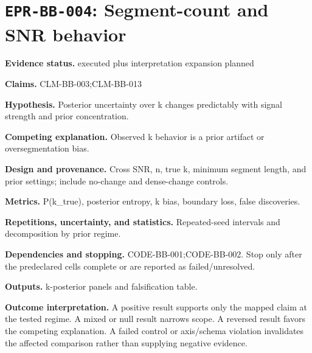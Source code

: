 \section[\texttt{EPR-BB-004}]{\texttt{EPR-BB-004}: Segment-count and SNR behavior}
\textbf{Evidence status.} executed plus interpretation expansion planned\par
\textbf{Claims.} CLM-BB-003;CLM-BB-013\par
\textbf{Hypothesis.} Posterior uncertainty over k changes predictably with signal strength and prior concentration.\par
\textbf{Competing explanation.} Observed k behavior is a prior artifact or oversegmentation bias.\par
\textbf{Design and provenance.} Cross SNR, n, true k, minimum segment length, and prior settings; include no-change and dense-change controls.\par
\textbf{Metrics.} P(k\_true), posterior entropy, k bias, boundary loss, false discoveries.\par
\textbf{Repetitions, uncertainty, and statistics.} Repeated-seed intervals and decomposition by prior regime.\par
\textbf{Dependencies and stopping.} CODE-BB-001;CODE-BB-002. Stop only after the predeclared cells complete or are reported as failed/unresolved.\par
\textbf{Outputs.} k-posterior panels and falsification table.\par
\textbf{Outcome interpretation.} A positive result supports only the mapped claim at the tested regime. A mixed or null result narrows scope. A reversed result favors the competing explanation. A failed control or axis/schema violation invalidates the affected comparison rather than supplying negative evidence.

